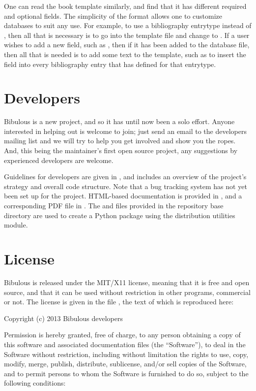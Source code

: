 \documentclass[letterpaper,10pt,english]{sphinxmanual}
\begin{document}
One can read the book template similarly, and find that it has different required and optional fields. The simplicity of the format allows one to customize databases to suit any use. For example, to use a bibliography entrytype  instead of , then all that is necessary is to go into the template file and change  to . If a user wishes to add a new field, such as , then if it has been added to the  database file, then all that is needed is to add some text to the template, such as  to insert the field into every bibliography entry that has  defined for that entrytype.


\section{Developers}
\label{index:developers}
Bibulous is a new project, and so it has until now been a solo effort. Anyone interested in helping out is welcome to join; just send an email to the developers mailing list and we will try to help you get involved and show you the ropes. And, this being the maintainer's first open source project, any suggestions by experienced developers are welcome.

Guidelines for developers are given in , and includes an overview of the project's strategy and overall code structure. Note that a bug tracking system has not yet been set up for the project. HTML-based documentation is provided in , and a corresponding PDF file in . The  and  files provided in the repository base directory are used to create a Python package using the  distribution utilities module.


\section{License}
\label{index:license}
Bibulous is released under the MIT/X11 license, meaning that it is free and open source, and that it can be used without restriction in other programs, commercial or not. The license is given in the file , the text of which is reproduced here:

Copyright (c) 2013 Bibulous developers

Permission is hereby granted, free of charge, to any person obtaining a copy of this software and
associated documentation files (the ``Software''), to deal in the Software without restriction,
including without limitation the rights to use, copy, modify, merge, publish, distribute,
sublicense, and/or sell copies of the Software, and to permit persons to whom the Software is
furnished to do so, subject to the following conditions:
\end{document}
